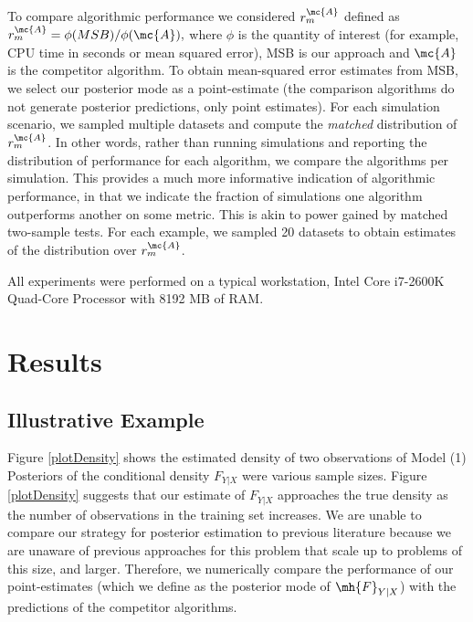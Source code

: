 To compare algorithmic performance we considered $r_{m}^{\mc{A}}$ defined as $r_{m}^{\mc{A}}=\phi(MSB)/\phi(\mc{A}),$
where $\phi$ is the quantity of interest (for example, CPU time in seconds or mean squared error), MSB is our approach and $\mc{A}$ is the competitor algorithm. To obtain mean-squared error estimates from MSB, we select our posterior mode as a point-estimate (the comparison algorithms do not generate posterior predictions, only point estimates).
For each simulation scenario, we sampled multiple datasets and compute the \emph{matched} distribution of $r_{m}^{\mc{A}}$. In other words, rather than running simulations and reporting the distribution of performance for each algorithm, we compare the algorithms per simulation.  This provides a much more informative indication of algorithmic performance, in that we indicate the fraction of simulations one algorithm outperforms another on some metric.  This is akin to power gained by matched two-sample tests.   For each example, we sampled 20 datasets to obtain estimates of the distribution over $r_m^{\mc{A}}$.

All experiments were performed on a typical workstation, Intel Core i7-2600K Quad-Core Processor with  8192 MB of RAM.


\section{Results}

\subsection{Illustrative Example}



Figure \ref{plotDensity} shows the estimated density of two observations of Model (1)  Posteriors of the conditional density  $F_{Y|X}$  were various sample sizes. Figure \ref{plotDensity} suggests that our estimate of $F_{Y|X}$ approaches the true density as the number of observations in the training set increases. We are unable to compare our strategy for posterior estimation to previous literature because we are unaware of previous approaches for this problem that scale up to problems of this size, and larger. Therefore, we numerically compare the performance of our point-estimates (which we define as the posterior mode of $\mh{F}_{Y|X}$) with the predictions of the competitor algorithms.

